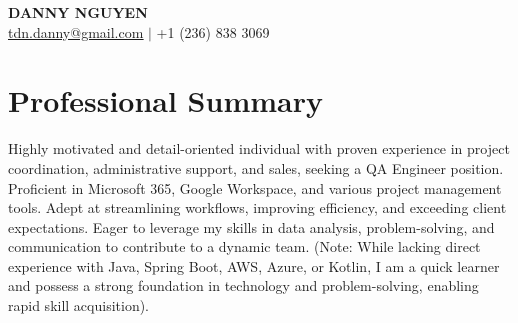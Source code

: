 \documentclass[letterpaper,11pt]{article}
\begin{document}
\pagecolor{DarkRed}
\color{white}
\begin{center}
\textbf{\Huge \scshape DANNY NGUYEN} \\ \vspace{1pt}
\small \href{mailto:tdn.danny@gmail.com}{\underline{tdn.danny@gmail.com}} $|$ +1 (236) 838 3069
\end{center}

\section{Professional Summary}
Highly motivated and detail-oriented individual with proven experience in project coordination, administrative support, and sales, seeking a QA Engineer position.  Proficient in Microsoft 365, Google Workspace, and various project management tools.  Adept at streamlining workflows, improving efficiency, and exceeding client expectations.  Eager to leverage my skills in data analysis, problem-solving, and communication to contribute to a dynamic team.  (Note:  While lacking direct experience with Java, Spring Boot, AWS, Azure, or Kotlin, I am a quick learner and possess a strong foundation in technology and problem-solving, enabling rapid skill acquisition).
\end{document}
